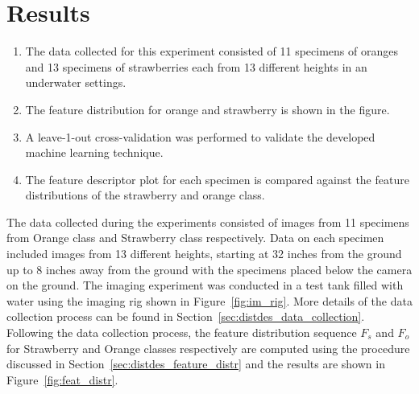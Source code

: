 \documentclass {udthesis}
\begin{document}
\section{Results}
\begin{enumerate}
	\item The data collected for this experiment consisted of 11 specimens of oranges and 13 specimens of strawberries each from 13 different heights in an underwater settings.
	
	\item The feature distribution for orange and strawberry is shown in the figure.
	
	\item A leave-1-out cross-validation was performed to validate the developed machine learning technique.
	
	\item The feature descriptor plot for each specimen is compared against the feature distributions of the strawberry and orange class.
\end{enumerate}

The data collected during the experiments consisted of images from 11 specimens from Orange class and Strawberry class respectively. Data on each specimen included images from 13 different heights, starting at 32 inches from the ground up to 8 inches away from the ground with the specimens placed below the camera on the ground. The imaging experiment was conducted in a test tank filled with water using the imaging rig shown in Figure~\ref{fig:im_rig}. More details of the data collection process can be found in Section~\ref{sec:distdes_data_collection}. Following the data collection process, the feature distribution sequence $F_{s}$ and $F_{o}$ for Strawberry and Orange classes respectively are computed using the procedure discussed in Section~\ref{sec:distdes_feature_distr} and the results are shown in Figure~\ref{fig:feat_distr}.
\end{document}
